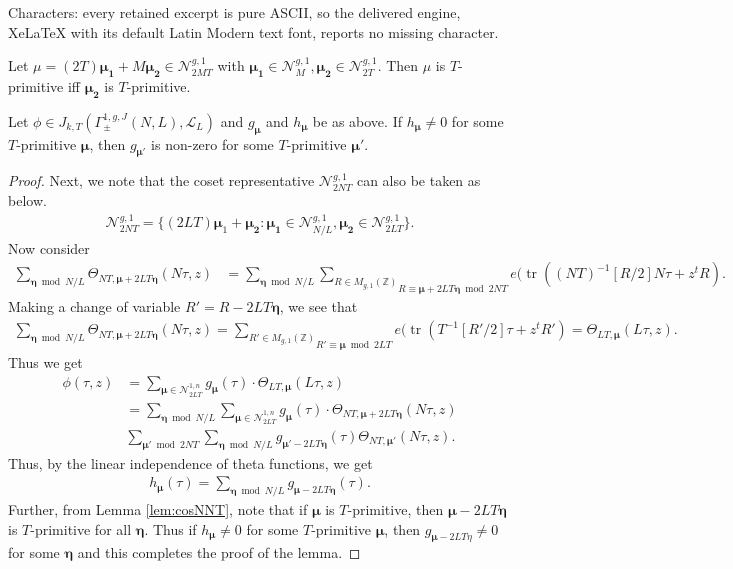 \documentclass[10pt,a4paper]{amsart}
\DeclareMathOperator{\tr}{tr}
\newcommand{\mc}{\mathcal}
\newcommand{\sumn}{\sum \nolimits}
\newcommand{\z}{\mathbb{Z}}
\begin{document}
Characters: every retained excerpt is pure ASCII, so the delivered engine, XeLaTeX with its default Latin Modern text font, reports no missing character.
\begin{lemma}\label{lem:cosNNT}
    Let $\mu=(2T)\bm{\mu_1}+M\bm{\mu_2}\in \mc N_{2MT}^{g,1} $ with $ \bm{\mu_1} \in  \mc N_{M}^{g,1}, \bm{\mu_2} \in \mc N_{2T}^{g,1}$. Then $\mu$ is $T$-primitive iff  $\bm{\mu_2}$ is $T$-primitive.
\end{lemma}

\begin{lemma}
    Let $\phi\in J_{k, T}(\Gamma_\pm^{1,g, J}(N, L), \mc L_L)$ and $g_{\bm\mu}$ and $h_{\bm\mu}$ be as above. If $h_{\bm\mu}\neq 0$ for some $T$-primitive $\bm\mu$, then $g_{\bm\mu'}$ is non-zero for some $T$-primitive $\bm\mu'$.
\end{lemma}

\begin{proof}
Next, we note that the coset representative $\mc N_{2NT}^{g,1}$ can also be taken as below.
\begin{align}
 \mc N_{2NT}^{g,1}=\{(2LT){\bm\mu_1}+\bm{\mu_2}: \bm{\mu_1} \in  \mc N_{N/L}^{g,1}, \bm{\mu_2} \in \mc N_{2LT}^{g,1} \}. 
\end{align}
Now consider 
\begin{align}
    \sum_{\bm\eta\bmod N/L}\Theta_{NT, \bm\mu+2LT\bm\eta}(N\tau, z)&=\sum_{\bm\eta\bmod N/L}\underset{R\equiv \bm\mu+2LT\bm\eta\bmod 2NT}{\sum_{R\in M_{g,1}(\z)}}
e(\tr( (NT)^{-1}[R/2]N\tau+z^tR).
\end{align}
Making a change of variable $R'=R-2LT\bm\eta$, we see that
\begin{align}
 \sum_{\bm\eta\bmod N/L}\Theta_{NT, \bm\mu+2LT\bm\eta}(N\tau, z)=\underset{R'\equiv \bm\mu\bmod  2LT}{\sum_{R'\in M_{g,1}(\z)}}
e(\tr( T^{-1}[R'/2]\tau+z^tR')=\Theta_{LT, \bm\mu}(L\tau, z).
\end{align}
Thus we get
\begin{align}
\phi(\tau, z)&=\sumn_{\bm\mu\in \mc N_{2LT}^{1,n}} g_{\bm\mu}(\tau)\cdot \Theta_{LT, \bm\mu}(L\tau,z)\\
&=\sumn_{\bm\eta\bmod N/L}\sumn_{\bm\mu\in \mc N_{2LT}^{1,n}} g_{\bm\mu}(\tau)\cdot \Theta_{NT, \bm\mu+2LT\bm\eta}(N\tau,z)\\
&\sumn_{\bm\mu'\bmod 2NT}\sumn_{\bm\eta\bmod N/L}g_{\bm\mu'-2LT\bm\eta}(\tau)\Theta_{NT, \bm\mu'}(N\tau,z).
\end{align}
Thus, by the linear independence of theta functions, we get
\begin{align}
    h_{\bm\mu}(\tau)=\sumn_{\bm\eta\bmod N/L}g_{\bm\mu-2LT\bm\eta}(\tau).
\end{align}
Further, from Lemma \ref{lem:cosNNT}, note that if $\bm\mu$ is $T$-primitive, then $\bm\mu-2LT\bm\eta$ is $T$-primitive for all $\bm\eta$. Thus if $h_{\bm\mu}\neq 0$ for some $T$-primitive $\bm\mu$, then $g_{\bm\mu-2LT\eta}\neq 0$ for some $\bm\eta$ and this completes the proof of the lemma.
\end{proof}
\end{document}
